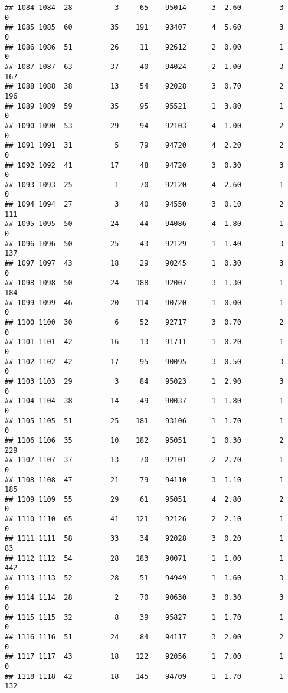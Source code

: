 \documentclass[
]{article}
\begin{document}
\begin{verbatim}
## 1084 1084  28          3     65    95014      3  2.60         3        0
## 1085 1085  60         35    191    93407      4  5.60         3        0
## 1086 1086  51         26     11    92612      2  0.00         1        0
## 1087 1087  63         37     40    94024      2  1.00         3      167
## 1088 1088  38         13     54    92028      3  0.70         2      196
## 1089 1089  59         35     95    95521      1  3.80         1        0
## 1090 1090  53         29     94    92103      4  1.00         2        0
## 1091 1091  31          5     79    94720      4  2.20         2        0
## 1092 1092  41         17     48    94720      3  0.30         3        0
## 1093 1093  25          1     70    92120      4  2.60         1        0
## 1094 1094  27          3     40    94550      3  0.10         2      111
## 1095 1095  50         24     44    94086      4  1.80         1        0
## 1096 1096  50         25     43    92129      1  1.40         3      137
## 1097 1097  43         18     29    90245      1  0.30         3        0
## 1098 1098  50         24    188    92007      3  1.30         1      184
## 1099 1099  46         20    114    90720      1  0.00         1        0
## 1100 1100  30          6     52    92717      3  0.70         2        0
## 1101 1101  42         16     13    91711      1  0.20         1        0
## 1102 1102  42         17     95    90095      3  0.50         3        0
## 1103 1103  29          3     84    95023      1  2.90         3        0
## 1104 1104  38         14     49    90037      1  1.80         1        0
## 1105 1105  51         25    181    93106      1  1.70         1        0
## 1106 1106  35         10    182    95051      1  0.30         2      229
## 1107 1107  37         13     70    92101      2  2.70         1        0
## 1108 1108  47         21     79    94110      3  1.10         1      185
## 1109 1109  55         29     61    95051      4  2.80         2        0
## 1110 1110  65         41    121    92126      2  2.10         1        0
## 1111 1111  58         33     34    92028      3  0.20         1       83
## 1112 1112  54         28    183    90071      1  1.00         1      442
## 1113 1113  52         28     51    94949      1  1.60         3        0
## 1114 1114  28          2     70    90630      3  0.30         3        0
## 1115 1115  32          8     39    95827      1  1.70         1        0
## 1116 1116  51         24     84    94117      3  2.00         2        0
## 1117 1117  43         18    122    92056      1  7.00         1        0
## 1118 1118  42         18    145    94709      1  1.70         1      132

\end{verbatim}
\end{document}
